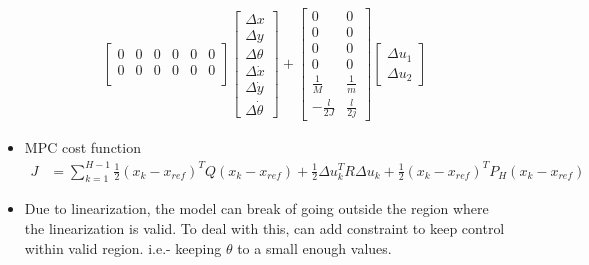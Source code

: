 \documentclass[11pt]{article}
\begin{document}
\begin{itemize}
\begin{align*}
\begin{bmatrix}
            0 & 0 & 0 & 0 & 0 & 0 \\
            0 & 0 & 0 & 0 & 0 & 0 \\
        \end{bmatrix}
        \begin{bmatrix}
            \Delta x \\
            \Delta y \\
            \Delta\theta \\
            \Delta \dot{x} \\
            \Delta \dot{y} \\
            \Delta \dot{\theta}
        \end{bmatrix}
        + 
        \begin{bmatrix}
            0 & 0 \\
            0 & 0 \\
            0 & 0 \\
            0 & 0 \\
            \frac{1}{M} & \frac{1}{m} \\
            -\frac{l}{2J} & \frac{l}{2j}
        \end{bmatrix}
        \begin{bmatrix}
            \Delta u_1 \\
            \Delta u_2
        \end{bmatrix}
    \end{align*}
    \item MPC cost function
    \begin{align*}
        J &= \sum_{k=1}^{H-1}\frac{1}{2}(x_k - x_{ref})^TQ(x_k-x_{ref}) + \frac{1}{2}\Delta u_k^TR\Delta u_k + \frac{1}{2}(x_k-x_{ref})^TP_H(x_k-x_{ref})
    \end{align*}
    \item Due to linearization, the model can break of going outside the region where the linearization is valid. To deal with this, can add constraint to keep control within valid region. i.e.- keeping $\theta$ to a small enough values.
\end{itemize}
\end{document}
